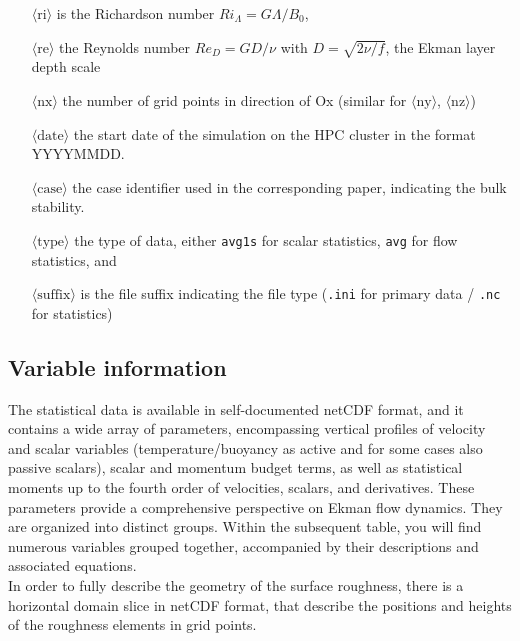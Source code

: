 \documentclass[11pt]{article}
\begin{document}
\begin{itemize}[itemindent=2em] 
    \item[$\langle \text{ri}\rangle$] is the Richardson number $Ri_\Lambda = G \Lambda / B_0$, 
    \item[$\langle \text{re}\rangle$] the Reynolds number $Re_D=G D /\nu$ with $D=\sqrt{2\nu/f}$, 
the Ekman layer depth scale 
    \item[$\langle \text{nx}\rangle$] the number of grid points in direction of Ox (similar for $\langle \text{ny}\rangle$, $\langle\text{nz}\rangle$)
    \item[$\langle \text{date}\rangle$] the start date of the simulation on the HPC cluster in the format YYYYMMDD. 
    \item[$\langle \text{case}\rangle$] the case identifier used in the corresponding paper, indicating the bulk stability. 
    \item[$\langle \text{type}\rangle$] the type of data, either \texttt{avg1s} for scalar statistics, \texttt{avg} for flow statistics, and 
    \item[$\langle \text{suffix}\rangle$] is the file suffix indicating the file type (\texttt{.ini} for primary data / \texttt{.nc} for statistics)
\end{itemize}

\subsection{Variable information} 
The statistical data is available in self-documented netCDF format, and it contains a wide array of parameters, encompassing vertical profiles of velocity and scalar variables (temperature/buoyancy as active and for some cases also passive scalars), scalar and momentum budget terms, as well as statistical moments up to the fourth order of velocities, scalars, and derivatives. These parameters provide a comprehensive perspective on Ekman flow dynamics. They are organized into distinct groups. Within the subsequent table, you will find numerous variables grouped together, accompanied by their descriptions and associated equations. \\
In order to fully describe the geometry of the surface roughness, there is a horizontal domain slice in netCDF format, that describe the positions and heights of the roughness elements in grid points.
\par

\end{document}
